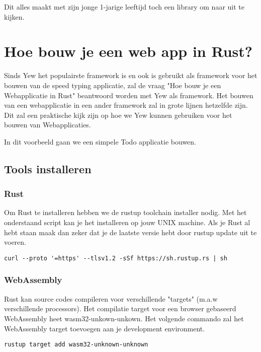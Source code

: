 Dit alles maakt met zijn jonge 1-jarige leeftijd toch een library om naar uit te kijken. 

\section{Hoe bouw je een web app in Rust?}

Sinds Yew het populairste framework is en ook is gebruikt als framework voor het bouwen van de speed
typing applicatie, zal de vraag "Hoe bouw je een Webapplicatie in Rust" beantwoord worden met Yew
als framework. Het bouwen van een webapplicatie in een ander framework zal in grote lijnen hetzelfde
zijn. Dit zal een praktische kijk zijn op hoe we Yew kunnen gebruiken voor het bouwen van
Webapplicaties.  

In dit voorbeeld gaan we een simpele Todo applicatie bouwen.

\subsection{Tools installeren}

\subsubsection{Rust}
Om Rust te installeren hebben we de rustup toolchain installer nodig. Met het onderstaand script kan
je het installeren op jouw UNIX machine. Als je Rust al hebt staan maak dan zeker dat je de laatste
versie hebt door rustup update uit te voeren.

\begin{verbatim}
curl --proto '=https' --tlsv1.2 -sSf https://sh.rustup.rs | sh
\end{verbatim}

\subsubsection{WebAssembly}

Rust kan source codes compileren voor verschillende "targets" (m.a.w verschillende processors). Het
compilatie target voor een browser gebaseerd WebAssembly heet wasm32-unkown-unkown. Het volgende
commando zal het WebAssembly target toevoegen aan je development environment.

\begin{verbatim}
rustup target add wasm32-unknown-unknown
\end{verbatim}

\clearpage

